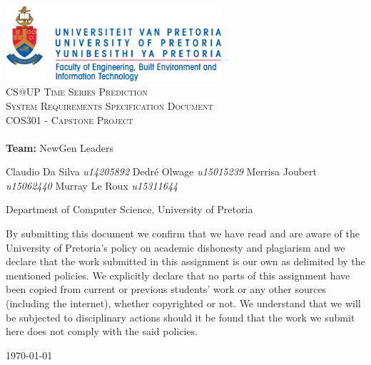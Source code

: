 \documentclass[a4paper,12pt]{article}
\begin{document}
	
	\begin{titlepage}
		\begin{center}
			
			\includegraphics[width=0.6\textwidth]{../images/up_logo.jpg}\\[2.0cm] 
			
			
			\textsc{\LARGE CS@UP Time Series Prediction}\\[1.0cm]
			
			
			\textsc{\Large System Requirements Specification Document}\\[0.75cm]
			
			
			\textsc{\Large COS301 - Capstone Project}\\[0.75cm]
			
			
			\textbf{\huge \\ Team:}
			\huge NewGen Leaders \\
			\begin{flushright} \large
				Claudio Da Silva		\emph{u14205892} \newline
				Dedr\'e Olwage	    	\emph{u15015239} \newline
				Merrisa Joubert			\emph{u15062440} \newline
				Murray Le Roux	    	\emph{u15311644} \newline
			\end{flushright}
			\small Department of Computer Science, University of Pretoria \\ 
			
			
		\end{center}
		
		\noindent By submitting this document we confirm that we have read and are aware of the University of Pretoria's policy on academic dishonesty and plagiarism and we declare that the work submitted in this assignment is our own as delimited by the mentioned policies. We explicitly declare that no parts of this assignment have been copied from current or previous students' work or any other sources (including the internet), whether copyrighted or not. We understand that we will be subjected to disciplinary actions should it be found that the work we submit here does not comply with the said policies.
		
		\begin{center}
			
			\vfill
			
			{\large \today}
			
		\end{center}
		
	\end{titlepage}
    
\end{document}
